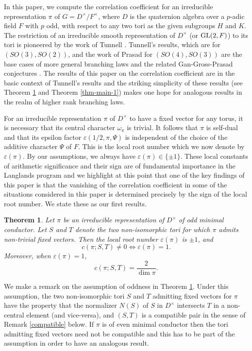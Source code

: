 \documentclass[12pt]{amsart}
\newtheorem{theorem}{Theorem}[section] %
\theoremstyle{definition}
\theoremstyle{remark}
\begin{document}
In this paper, we compute the correlation coefficient for an irreducible representation $\pi$ of $G=D^\times/F^\times$, where $D$ is the quaternion algebra over a $p$-adic field $F$ with $p$ odd, with respect to any two tori as the given subgroups $H$ and $K$. The restriction of an irreducible smooth representation of $D^\times$ (or ${\rm GL}(2,F)$) to its tori is pioneered by the work of Tunnell \cite{tun83,hsy93,sai93}. Tunnell's results, which are for $(SO(3),SO(2))$, and the work of Prasad for $(SO(4),SO(3))$ \cite{pra90,pra92} are the base cases of more general branching laws and the related Gan-Gross-Prasad conjectures \cite{ggp12}. The results of this paper on the correlation coefficient are in the basic context of Tunnell's results and the striking simplicity of these results (see Theorem \ref{thm-main} and Theorem \ref{thm-main-1}) makes one hope for analogous results in the realm of higher rank branching laws.
   
For an irreducible representation $\pi$ of $D^\times$ to have a fixed vector for any torus, it is necessary that its central character $\omega_\pi$ is trivial. It follows that $\pi$ is self-dual and that its epsilon factor $\varepsilon(1/2,\pi,\Psi)$ is independent of the choice of the additive character $\Psi$ of $F$. This is the local root number which we now denote by $\varepsilon(\pi)$.  By our assumptions, we always have $\varepsilon(\pi) \in \{\pm 1\}$. These local constants of arithmetic significance and their sign are of fundamental importance in the Langlands program and we highlight at this point that one of the key findings of this paper is that the vanishing of the correlation coefficient in some of the situations considered in this paper is determined precisely by the sign of the local root number. We state these as our first results.

\begin{theorem}\label{thm-main}
Let $\pi$ be an irreducible representation of $D^\times$ of odd minimal conductor. Let $S$ and $T$ denote the two non-isomorphic tori for which $\pi$ admits non-trivial fixed vectors. Then the local root number $\varepsilon(\pi)$ is $\pm 1$, and 
\[c(\pi; S, T) \neq 0 \iff \varepsilon(\pi) = 1.\]
Moreover, when $\varepsilon(\pi) = 1$,
\[c(\pi; S, T) = \frac{2}{\dim \pi}.\]
\end{theorem}

We make a remark on the assumption of oddness in Theorem \ref{thm-main}. Under this assumption, the two non-isomorphic tori $S$ and  $T$ admitting fixed vectors for $\pi$ have the property that the normalizer $N(S)$ of $S$ in $D^\times$ intersects $T$ in a non-central element (and vice-versa), and $(S,T)$ is a compatible pair in the sense of Remark \ref{compatible} below. If $\pi$ is of even minimal conductor then the tori admitting fixed vectors need not be compatible and this has to be part of the assumption in order to have an analogous result. 
\end{document}
